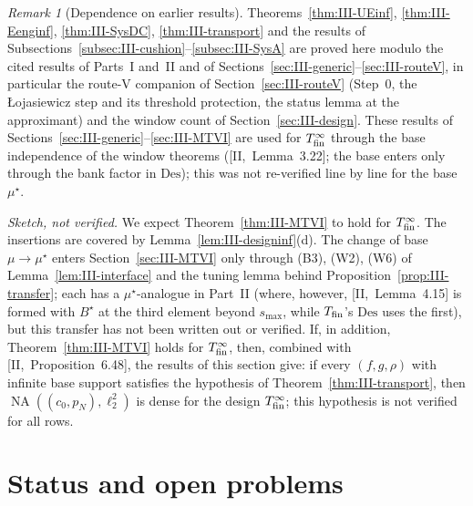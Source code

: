 \documentclass[10pt]{amsart}
\theoremstyle{definition}
\theoremstyle{remark}
\newtheorem{remark}[theorem]{Remark}
\newcommand{\NA}{\operatorname{NA}}
\begin{document}
\begin{remark}[Dependence on earlier results]\label{rem:III-infdep}
Theorems~\ref{thm:III-UEinf}, \ref{thm:III-Eenginf}, \ref{thm:III-SysDC},
\ref{thm:III-transport} and the results of
Subsections~\ref{subsec:III-cushion}--\ref{subsec:III-SysA} are proved here
modulo the cited results of Parts~I and~II and of
Sections~\ref{sec:III-generic}--\ref{sec:III-routeV}, in particular the route-V
companion of Section~\ref{sec:III-routeV} (Step~0, the \L ojasiewicz step and its
threshold protection, the status lemma at the approximant) and the window count
of Section~\ref{sec:III-design}.  These results of
Sections~\ref{sec:III-generic}--\ref{sec:III-MTVI} are used for
$T^\infty_{\rm fin}$ through the base independence of the window theorems
([II,~Lemma~3.22]; the base enters only through the bank factor in
$\mathrm{Des}$); this was not re-verified line by line for the base
$\mu^\star$.

\emph{Sketch, not verified.}  We expect Theorem~\ref{thm:III-MTVI} to hold for
$T^\infty_{\rm fin}$.  The insertions are covered by
Lemma~\ref{lem:III-designinf}(d).  The change of base $\mu\to\mu^\star$
enters Section~\ref{sec:III-MTVI} only through (B3), (W2), (W6) of
Lemma~\ref{lem:III-interface} and the tuning lemma behind
Proposition~\ref{prop:III-transfer}; each has a $\mu^\star$-analogue in
Part~II (where, however, [II,~Lemma~4.15] is formed with $B^\star$ at the
third element beyond $s_{\max}$, while $T_{\rm fin}$'s $\mathrm{Des}$ uses the
first), but this transfer has not been written out or verified.  If, in
addition, Theorem~\ref{thm:III-MTVI} holds for $T^\infty_{\rm fin}$, then,
combined with [II,~Proposition~6.48], the results of this section give: if
every $(f,g,\rho)$ with infinite base support satisfies the hypothesis of
Theorem~\ref{thm:III-transport}, then $\NA((c_0,p_N),\ell_2^2)$ is dense for
the design $T^\infty_{\rm fin}$; this hypothesis is not verified for all
rows.
\end{remark}

\section{Status and open problems}\label{sec:III-status}
\end{document}
